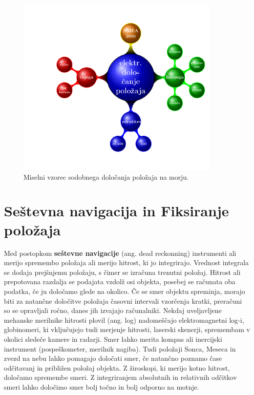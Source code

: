 
\begin{figure}
	\centering
	\includegraphics[height=9cm]{Predavanja/03_ElektrDolocPolozaja/figs/MiselniVzorec_ElDolPol.pdf}
	\caption{Miselni vzorec sodobnega določanja položaja na morju.}
	\label{fig:ShElDolP}
\end{figure}

\section{Seštevna navigacija in Fiksiranje položaja}
\label{sec:SestNavInFiksPoloz}

Med postopkom \textbf{seštevne navigacije} (ang. dead reckonning) instrumenti ali merijo spremembo položaja ali merijo hitrost, ki jo integrirajo. Vrednost integrala se dodaja prejšnjemu položaju, s čimer se izračuna trenutni položaj. Hitrost ali prepotovana razdalja se podajata vzdolž osi objekta, posebej se računata oba podatka, če ju določamo glede na okolico. Če se smer objektu spreminja, morajo biti za natančne določitve položaja časovni intervali vzorčenja kratki, preračuni so se opravljali ročno, danes jih izvajajo računalniki. Nekdaj uveljavljene mehanske merilnike hitrosti plovil (ang. log) nadomeščajo elektromagnetni log-i, globinomeri, ki vključujejo tudi merjenje hitrosti, laserski skenerji, spremembam v okolici sledeče kamere in radarji. Smer lahko merita kompas ali inercijski instrument (pospeškometer, merilnik nagiba). Tudi položaji Sonca, Meseca in zvezd na nebu lahko pomagajo določati smer, če natančno poznamo čase odčitavanj in približen položaj objekta. Z žiroskopi, ki merijo kotno hitrost, določamo spremembe smeri. Z integriranjem absolutnih in relativnih odčitkov smeri lahko določimo smer bolj točno in bolj odporno na motnje.     

